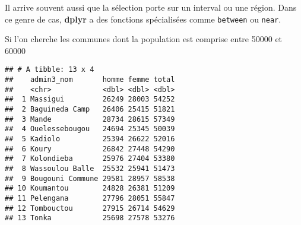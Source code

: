 \documentclass[]{book}
\newenvironment{Shaded}{\begin{snugshade}}{\end{snugshade}}
\newcommand{\KeywordTok}[1]{\textcolor[rgb]{0.13,0.29,0.53}{\textbf{#1}}}
\newcommand{\DecValTok}[1]{\textcolor[rgb]{0.00,0.00,0.81}{#1}}
\newcommand{\StringTok}[1]{\textcolor[rgb]{0.31,0.60,0.02}{#1}}
\newcommand{\CommentTok}[1]{\textcolor[rgb]{0.56,0.35,0.01}{\textit{#1}}}
\newcommand{\OperatorTok}[1]{\textcolor[rgb]{0.81,0.36,0.00}{\textbf{#1}}}
\newcommand{\NormalTok}[1]{#1}
\begin{document}
Il arrive souvent aussi que la sélection porte sur un interval ou une
région. Dans ce genre de cas, \textbf{dplyr} a des fonctions
spécialisées comme \texttt{between} ou \texttt{near}.

Si l'on cherche les communes dont la population est comprise entre 50000
et 60000

\begin{Shaded}
\end{Shaded}

\begin{verbatim}
## # A tibble: 13 x 4
##    admin3_nom       homme femme total
##    <chr>            <dbl> <dbl> <dbl>
##  1 Massigui         26249 28003 54252
##  2 Baguineda Camp   26406 25415 51821
##  3 Mande            28734 28615 57349
##  4 Ouelessebougou   24694 25345 50039
##  5 Kadiolo          25394 26622 52016
##  6 Koury            26842 27448 54290
##  7 Kolondieba       25976 27404 53380
##  8 Wassoulou Balle  25532 25941 51473
##  9 Bougouni Commune 29581 28957 58538
## 10 Koumantou        24828 26381 51209
## 11 Pelengana        27796 28051 55847
## 12 Tombouctou       27915 26714 54629
## 13 Tonka            25698 27578 53276
\end{verbatim}
\end{document}
